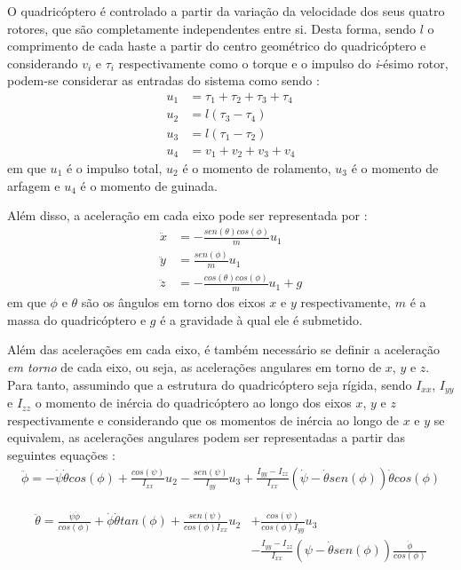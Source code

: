 O quadricóptero é controlado a partir da variação da velocidade dos seus quatro rotores, que são completamente independentes entre si. Desta forma, sendo $l$ o comprimento de cada haste a partir do centro geométrico do quadricóptero e considerando $v_i$ e $\tau_i$ respectivamente como o torque e o impulso do \textit{i}-ésimo rotor, podem-se considerar as entradas do sistema como sendo \cite[p.~4]{Balas2007}:
\begin{align}
u_1 &= \tau_1+\tau_2+\tau_3+\tau_4 \\
u_2 &= l(\tau_3-\tau_4) \\
u_3 &= l(\tau_1-\tau_2) \\
u_4 &= v_1+v_2+v_3+v_4
\end{align}
em que $u_1$ é o impulso total, $u_2$ é o momento de rolamento, $u_3$ é o momento de arfagem e $u_4$ é o momento de guinada.

Além disso, a aceleração em cada eixo pode ser representada por \cite[p.~5]{Balas2007}:
\begin{align}
\ddot{x} &= -\frac{sen(\theta)cos(\phi)}{m}u_1  \\
\ddot{y} &= \frac{sen(\phi)}{m}u_1  \\
\ddot{z} &= - \frac{cos(\theta)cos(\phi)}{m}u_1 +g
\end{align}
em que $\phi$ e $\theta$ são os ângulos em torno dos eixos $x$ e $y$ respectivamente, $m$ é a massa do quadricóptero e $g$ é a gravidade à qual ele é submetido.

Além das acelerações em cada eixo, é também necessário se definir a aceleração \textit{em torno} de cada eixo, ou seja, as acelerações angulares em torno de $x$, $y$ e $z$. Para tanto, assumindo que a estrutura do quadricóptero seja rígida, sendo $I_{xx}$, $I_{yy}$ e $I_{zz}$ o momento de inércia do quadricóptero ao longo dos eixos $x$, $y$ e $z$ respectivamente e considerando que os momentos de inércia ao longo de $x$ e $y$ se equivalem, as acelerações angulares podem ser representadas a partir das seguintes equações \cite[p.~6]{Balas2007}:
\begin{align}
\ddot{\phi} = -\dot{\psi}\dot{\theta}cos(\phi) + 
\frac{cos(\psi)}{I_{xx}}u_2 - 
\frac{sen(\psi)}{I_{yy}}u_3 + 
\frac{I_{yy}-I_{zz}}{I_{xx}}(\dot{\psi}-\dot{\theta}sen(\phi))\dot{\theta}cos(\phi)
\end{align}

\begin{align}
\begin{split}
\ddot{\theta} = \frac{\dot{\psi}\dot{\phi}}{cos(\phi)} +
\dot{\phi}\dot{\theta}tan(\phi) + 
\frac{sen(\psi)}{cos(\phi)I_{xx}}u_2 &+ 
\frac{cos(\psi)}{cos(\phi)I_{yy}}u_3 \\ 
&-\frac{I_{yy}-I_{zz}}{I_{xx}}(\psi-\dot{\theta}sen(\phi))\frac{\dot{\phi}}{cos(\phi)}
\end{split}
\end{align}

